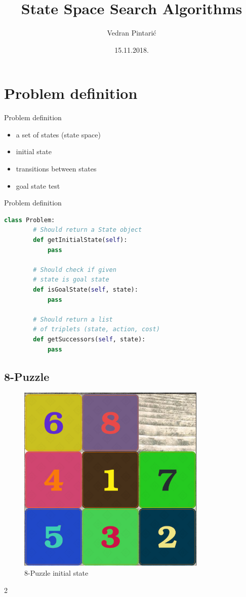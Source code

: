 \documentclass{beamer}
\title[State Space Search Algorithms]{State Space Search Algorithms}
\author{Vedran Pintarić}
\date{15.11.2018.}
\begin{document}
\begin{frame}
  \titlepage
\end{frame}

\section{Problem definition}

\begin{frame}{Problem definition}

	\begin{itemize}
		\item a set of states (state space)
		\item initial state
		\item transitions between states
		\item goal state test
	\end{itemize}

\end{frame}

\begin{frame}[fragile]{Problem definition}

	\begin{lstlisting}[language=Python]
	class Problem:
		# Should return a State object
		def getInitialState(self):
			pass
	
		# Should check if given
		# state is goal state
		def isGoalState(self, state):
			pass
	
		# Should return a list
		# of triplets (state, action, cost)
		def getSuccessors(self, state):
			pass
	\end{lstlisting}

\end{frame}

\subsection{8-Puzzle}

\begin{frame}
	\begin{figure}
	\centering
		\includegraphics[width=0.5\linewidth]{puzzle8.png}
		\caption{8-Puzzle initial state}
	\end{figure}
2\end{frame}
\end{document}
